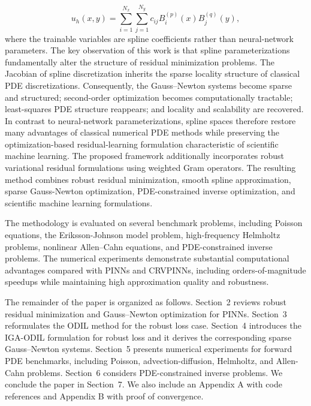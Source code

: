 \documentclass[review]{elsarticle}
\begin{document}
\begin{equation}
u_h(x,y)=
\sum_{i=1}^{N_x}
\sum_{j=1}^{N_y}
c_{ij}
B_i^{(p)}(x)
B_j^{(q)}(y),
\label{eq:intro_spline}
\end{equation}
where the trainable variables are spline coefficients rather than neural-network parameters.
The key observation of this work is that spline parameterizations fundamentally alter the structure of residual minimization problems. The Jacobian of spline discretization inherits the sparse locality structure of classical PDE discretizations. Consequently, the Gauss–Newton systems become sparse and structured;
second-order optimization becomes computationally tractable;
least-squares PDE structure reappears;
and locality and scalability are recovered.
In contrast to neural-network parameterizations, spline spaces therefore restore many advantages of classical numerical PDE methods while preserving the optimization-based residual-learning formulation characteristic of scientific machine learning.
The proposed framework additionally incorporates robust variational residual formulations using weighted Gram operators. The resulting method combines robust residual minimization,
 smooth spline approximation,
 sparse Gauss-Newton optimization,
 PDE-constrained inverse optimization,
and scientific machine learning formulations.

The methodology is evaluated on several benchmark problems, including Poisson equations, the Eriksson-Johnson model problem, high-frequency Helmholtz problems,
nonlinear Allen–Cahn equations,
and PDE-constrained inverse problems.
The numerical experiments demonstrate substantial computational advantages compared with PINNs and CRVPINNs, including orders-of-magnitude speedups while maintaining high approximation quality and robustness.

The remainder of the paper is organized as follows. Section~2 reviews robust residual minimization and Gauss--Newton optimization for PINNs. Section~3 reformulates the ODIL method for the robust loss case. Section~4 introduces the IGA-ODIL formulation for robust loss and it derives the corresponding sparse Gauss--Newton systems. Section~5 presents numerical experiments for forward PDE benchmarks, including Poisson, advection-diffusion, Helmholtz, and Allen-Cahn problems. Section~6 considers PDE-constrained inverse problems. We conclude the paper in Section~7. We also include an Appendix A with code references and Appendix B with proof of convergence.
\end{document}
